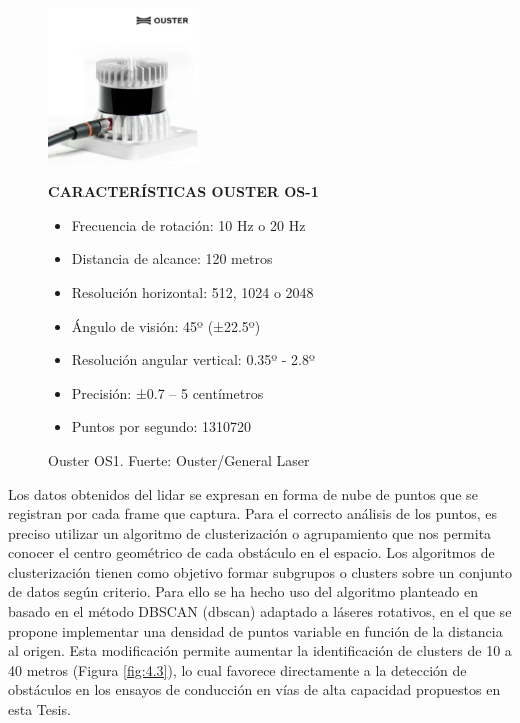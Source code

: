 \newpage
\begin{figure}[htb]
\centering
\begin{minipage}{.4\textwidth}
    \includegraphics[width=4cm]{figures/4.2.png}
    \caption{Ouster OS1. Fuerte: Ouster/General Laser}
    \label{fig:4.2}
\end{minipage}
\begin{minipage}{.5\textwidth} 
\setlength{\parskip}{0.2cm}
\textbf{CARACTERÍSTICAS OUSTER OS-1}
\begin{itemize}
    \item Frecuencia de rotación: 10 Hz o 20 Hz
    \item Distancia de alcance: 120 metros
    \item Resolución horizontal: 512, 1024 o 2048
    \item Ángulo de visión: 45º (±22.5º)
    \item Resolución angular vertical: 0.35º - 2.8º
    \item Precisión: ±0.7 – 5 centímetros
    \item Puntos por segundo: 1310720
\end{itemize}
\end{minipage}
\end{figure}

Los datos obtenidos del \gls{lidar} se expresan en forma de nube de puntos que se registran por cada frame que captura. Para el correcto análisis de los puntos, es preciso utilizar un algoritmo de clusterización o agrupamiento que nos permita conocer el centro geométrico de cada obstáculo en el espacio. Los algoritmos de clusterización tienen como objetivo formar subgrupos o clusters sobre un conjunto de datos según criterio. Para ello se ha hecho uso del algoritmo planteado en \textcite{clavijo} basado en el método DBSCAN (\gls{dbscan}) adaptado a láseres rotativos, en el que se propone implementar una densidad de puntos variable en función de la distancia al origen. Esta modificación permite aumentar la identificación de clusters de 10 a 40 metros (Figura \ref{fig:4.3}), lo cual favorece directamente a la detección de obstáculos en los ensayos de conducción en vías de alta capacidad propuestos en esta Tesis.

